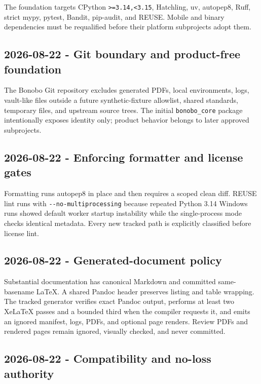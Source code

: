 \documentclass[
  letterpaper,
]{article}
\begin{document}
The foundation targets CPython \nolinkurl{>=3.14,<3.15}, Hatchling, uv, autopep8, Ruff, strict mypy, pytest, Bandit,
pip-audit, and REUSE. Mobile and binary dependencies must be requalified before their platform subprojects adopt them.

\subsection{2026-08-22 - Git boundary and product-free
foundation}\label{2026-08-22---git-boundary-and-product-free-foundation}

The Bonobo Git repository excludes generated PDFs, local environments, logs, vault-like files outside a future
synthetic-fixture allowlist, shared standards, temporary files, and upstream source trees. The initial
\nolinkurl{bonobo_core} package intentionally exposes identity only; product behavior belongs to later approved
subprojects.

\subsection{2026-08-22 - Enforcing formatter and license
gates}\label{2026-08-22---enforcing-formatter-and-license-gates}

Formatting runs autopep8 in place and then requires a scoped clean diff. REUSE lint runs with
\nolinkurl{--no-multiprocessing} because repeated Python 3.14 Windows runs showed default worker startup instability
while the single-process mode checks identical metadata. Every new tracked path is explicitly classified before license
lint.

\subsection{2026-08-22 - Generated-document policy}\label{2026-08-22---generated-document-policy}

Substantial documentation has canonical Markdown and committed same-basename LaTeX. A shared Pandoc header preserves
listing and table wrapping. The tracked generator verifies exact Pandoc output, performs at least two XeLaTeX passes and
a bounded third when the compiler requests it, and emits an ignored manifest, logs, PDFs, and optional page renders.
Review PDFs and rendered pages remain ignored, visually checked, and never committed.

\subsection{2026-08-22 - Compatibility and no-loss authority}\label{2026-08-22---compatibility-and-no-loss-authority}
\end{document}
